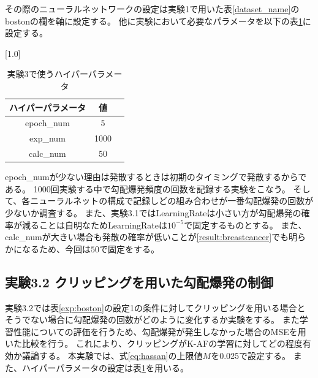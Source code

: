 その際のニューラルネットワークの設定は実験1で用いた表\ref{dataset_name}のbostonの欄を軸に設定する。
他に実験において必要なパラメータを以下の表\ref{exp31hyper}に設定する。


\begin{table}[hbtp]
    \begin{center}
        \caption{実験3で使うハイパーパラメータ}
        \label{exp31hyper}
        \vspace{2mm} 
        \scalebox{1.0}[1.0]{
            \begin{tabular}{||c|c|c||}
            \hline
            ハイパーパラメータ  & 値 \\
            \hline
            epoch\_num & 5  \\
            \hline
            exp\_num & 1000 \\
            \hline
            calc\_num & 50  \\
            \hline
            \end{tabular}
        }
    \end{center}
\end{table}

epoch\_numが少ない理由は発散するときは初期のタイミングで発散するからである。
1000回実験する中で勾配爆発頻度の回数を記録する実験をこなう。
そして、各ニューラルネットの構成で記録しどの組み合わせが一番勾配爆発の回数が少ないか調査する。
また、実験3.1ではLearningRateは小さい方が勾配爆発の確率が減ることは自明なためLearningRateは$ 10^{-5} $で固定するものとする。
また、calc\_numが大きい場合も発散の確率が低いことが\ref{result:breastcancer}でも明らかになるため、今回は$ 50 $で固定をする。



\subsection{実験3.2 クリッピングを用いた勾配爆発の制御}
\label{exp3.2}
実験3.2では表\ref{exp:boston}の設定1の条件に対してクリッピングを用いる場合とそうでない場合に勾配爆発の回数がどのように変化するか実験をする。
また学習性能についての評価を行うため、勾配爆発が発生しなかった場合のMSEを用いた比較を行う。
これにより、クリッピングがK-AFの学習に対してどの程度有効か議論する。
本実験では、式\ref{eq:hassan}の上限値$ M $を0.025で設定する。
また、ハイパーパラメータの設定は表\ref{exp31hyper}を用いる。


